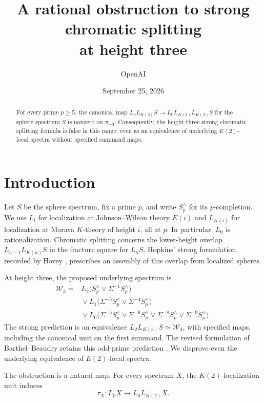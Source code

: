 \documentclass[11pt]{article}
\title{A rational obstruction to strong chromatic splitting\\at height three}
\author{OpenAI}
\date{September 25, 2026}
\numberwithin{equation}{section}
\theoremstyle{definition}
\theoremstyle{remark}
\begin{document}
\maketitle
\begin{abstract}
For every prime \(p\ge5\), the canonical map
\(L_0L_{K(3)}S\to L_0L_{K(2)}L_{K(3)}S\) for the sphere spectrum \(S\)
is nonzero on \(\pi_{-3}\). Consequently, the height-three strong chromatic
splitting formula is false in this range, even as an equivalence of
underlying \(E(2)\)-local spectra without specified summand maps.
\end{abstract}
\tableofcontents
\section{Introduction}
\label{sec:introduction}

Let \(S\) be the sphere spectrum, fix a prime \(p\), and write
\(S_p^\wedge\) for its \(p\)-completion. We use \(L_i\) for localization
at Johnson--Wilson theory \(E(i)\) and \(L_{K(i)}\) for localization at
Morava \(K\)-theory of height \(i\), all at \(p\). In particular, \(L_0\)
is rationalization. Chromatic splitting concerns the lower-height
overlap \(L_{n-1}L_{K(n)}S\) in the fracture square for \(L_nS\).
Hopkins' strong formulation, recorded by Hovey
\cite[Conjecture~4.2]{Hovey1995}, prescribes an assembly of this overlap
from localized spheres.

At height three, the proposed underlying spectrum is
\begin{equation}\label{eq:proposed-wedge}
\begin{aligned}
 \mathcal W_3={}&L_2\bigl(S_p^\wedge\vee\Sigma^{-1}S_p^\wedge\bigr)\\
 &{}\vee L_1\bigl(\Sigma^{-3}S_p^\wedge\vee\Sigma^{-4}S_p^\wedge\bigr)\\
 &{}\vee L_0\bigl(\Sigma^{-5}S_p^\wedge\vee\Sigma^{-6}S_p^\wedge
             \vee\Sigma^{-8}S_p^\wedge\vee\Sigma^{-9}S_p^\wedge\bigr).
\end{aligned}
\end{equation}
The strong prediction is an equivalence
\(L_2L_{K(3)}S\simeq\mathcal W_3\), with specified maps, including the
canonical unit on the first summand. The revised formulation of
Barthel--Beaudry retains this odd-prime prediction
\cite[Conjecture~6.3 and Remark~6.4]{BB2019}. We disprove even the
underlying equivalence of \(E(2)\)-local spectra.

The obstruction is a natural map. For every spectrum \(X\), the
\(K(2)\)-localization unit induces
\[
 \tau_X:L_0X\longrightarrow L_0L_{K(2)}X.
\]
\end{document}
